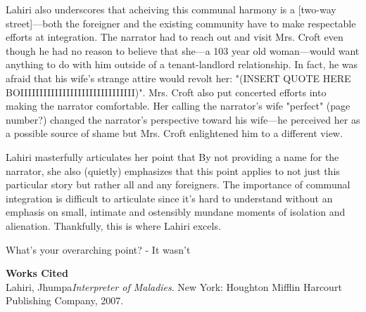 \documentclass[12pt]{article}
\begin{document}
Lahiri also underscores that acheiving this communal harmony is a [two-way street]---both the foreigner
and the existing community have to make respectable efforts at integration. The narrator had to reach out
and visit Mrs. Croft even though he had no reason to believe that she---a 103 year old woman---would want
anything to do with him outside of a tenant-landlord relationship. In fact, he was afraid that his wife's
strange attire would revolt her: "(INSERT QUOTE HERE BOIIIIIIIIIIIIIIIIIIIIIIIIIIIIII)". Mrs. Croft
also put concerted efforts into making the narrator comfortable. Her calling the narrator's wife 
"perfect" (page number?) changed the narrator's perspective toward his wife---he perceived her
as a possible source of shame but Mrs. Croft enlightened him to a different view. 

Lahiri masterfully articulates her point that 
By not providing a name for the narrator, she also (quietly) emphasizes that this point applies to not just this particular story but rather all and any foreigners.
The importance of communal integration is difficult to articulate since it's hard to understand without an
emphasis on small, intimate and ostensibly mundane moments of isolation and alienation. Thankfully, this is where Lahiri excels.



What's your overarching point? 
	- It wasn't
\begin{center}
  \textbf{Works Cited} \\
Lahiri, Jhumpa\textit{Interpreter of Maladies}. New York: Houghton Mifflin Harcourt Publishing Company, 2007.
\end{center}
\end{document}
